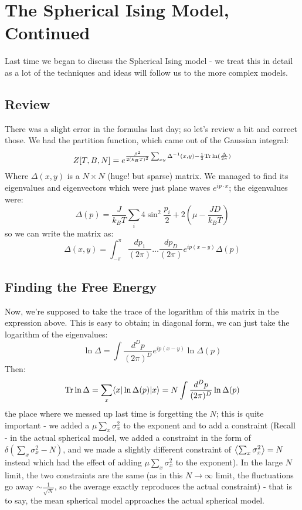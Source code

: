 \section{The Spherical Ising Model, Continued}
Last time we began to discuss the Spherical Ising model - we treat this in detail as a lot of the techniques and ideas will follow us to the more complex models.

\subsection{Review}
There was a slight error in the formulas last day; so let's review a bit and correct those. We had the partition function, which came out of the Gaussian integral:
\begin{equation}
    Z[T, B, N] = e^{\frac{\beta^2}{2(k_B T)^2}\sum_{xy}\Delta^{-1}(x, y) - \frac{1}{2}\mathrm{Tr}\ln(\frac{\Delta}{2\pi})}
\end{equation}
Where $\Delta(x, y)$ is a $N \times N$ (huge! but sparse) matrix. We managed to find its eigenvalues and eigenvectors which were just plane waves $e^{ip \cdot x}$; the eigenvalues were:
\begin{equation}
    \Delta(p) = \frac{J}{k_B T}\sum_i 4\sin^2\frac{p_i}{2} + 2(\mu - \frac{JD}{k_B T})
\end{equation}
so we can write the matrix as:
\begin{equation}
    \Delta(x, y) = \int_{-\pi}^\pi \frac{dp_1}{(2\pi)} \ldots \frac{dp_D}{(2\pi)} e^{ip(x - y)}\Delta(p)
\end{equation}

\subsection{Finding the Free Energy}
Now, we're supposed to take the trace of the logarithm of this matrix in the expression above. This is easy to obtain; in diagonal form, we can just take the logarithm of the eigenvalues:
\begin{equation}
    \ln \Delta = \int \frac{d^D p}{(2\pi)^D} e^{ip(x - y)}\ln \Delta(p)
\end{equation}
Then:
\begin{equation}
    \mathrm{Tr} \ln \Delta = \sum_x \langle x \rvert\ln \Delta(p) \lvert x \rangle = N\int \frac{d^D p}{(2\pi)^D}\ln \Delta(p)
\end{equation}
the place where we messed up last time is forgetting the $N$; this is quite important - we added a $\mu \sum_x \sigma_x^2$ to the exponent and to add a constraint (Recall - in the actual spherical model, we added a constraint in the form of $\delta(\sum_x \sigma_x^2 - N)$, and we made a slightly different constraint of $\left< \sum_x \sigma_x^2 \right> = N$ instead which had the effect of adding $\mu \sum_x \sigma_x^2$ to the exponent). In the large $N$ limit, the two constraints are the same (as in this $N \to \infty$ limit, the fluctuations go away $\sim \frac{1}{\sqrt{N}}$, so the average exactly reproduces the actual constraint) - that is to say, the mean spherical model approaches the actual spherical model.

